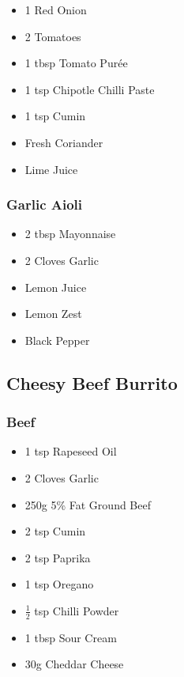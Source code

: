 \documentclass[11pt, english]{article}
\begin{document}
	\begin{itemize}
        \setlength\itemsep{0cm}
                \item 1 Red Onion
		\item 2 Tomatoes
		\item 1 tbsp Tomato Pur\'{e}e
		\item 1 tsp Chipotle Chilli Paste
		\item 1 tsp Cumin
		\item Fresh Coriander
		\item Lime Juice
        \end{itemize}

		\subsubsection*{Garlic Aioli}

	\begin{itemize}
        \setlength\itemsep{0cm}
                \item 2 tbsp Mayonnaise
		\item 2 Cloves Garlic
		\item Lemon Juice
		\item Lemon Zest
		\item Black Pepper
        \end{itemize}

\newpage

	\subsection{Cheesy Beef Burrito}

		\subsubsection*{Beef}

	\begin{itemize}
        \setlength\itemsep{0cm}
                \item 1 tsp Rapeseed Oil
		\item 2 Cloves Garlic
		\item 250g 5\% Fat Ground Beef
		\item 2 tsp Cumin
		\item 2 tsp Paprika
		\item 1 tsp Oregano
		\item $\frac{1}{2}$ tsp Chilli Powder
		\item 1 tbsp Sour Cream
		\item 30g Cheddar Cheese
        \end{itemize}
\end{document}
